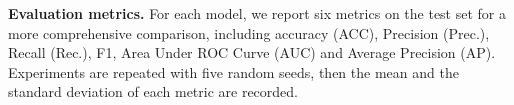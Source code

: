 \documentclass[final]{cvpr}
\newcommand{\bangyan}[1]{#1}
\begin{document}
\textbf{Evaluation metrics.} \bangyan{For each model, we report six metrics on the test set for a more comprehensive comparison, including} accuracy (ACC), Precision (Prec.), Recall (Rec.), F1, Area Under ROC Curve (AUC) and Average Precision (AP). \bangyan{Experiments are repeated with five random seeds, then the mean and the standard deviation of each metric are recorded.} 
\end{document}
